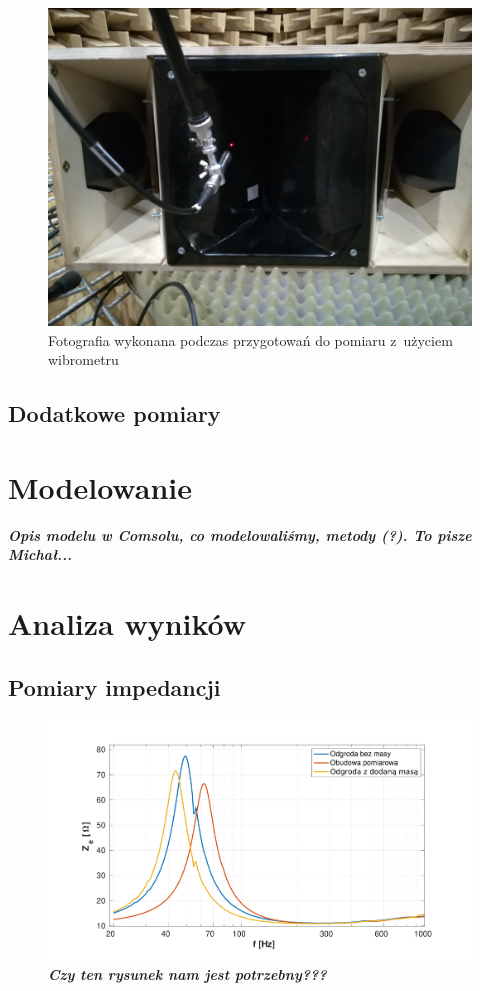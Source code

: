 \documentclass[12pt]{oska}
\newcommand{\comment}[1]{{\color{magenta}\emph{\textbf{#1}}}}
\begin{document}
			\begin{figure}[!ht]
				\centering
				\includegraphics[width=.8\textwidth]{zdjecie_wibro.jpg}
				\caption{Fotografia wykonana podczas przygotowań do pomiaru z~użyciem wibrometru}
				\label{r:zdjecie_wibro}
			\end{figure}

	
	\subsection{Dodatkowe pomiary}\label{ss:dodatkowe}

\section{Modelowanie}

	\comment{Opis modelu w Comsolu, co modelowaliśmy, metody (?). To pisze Michał...}

\section{Analiza wyników}

	\subsection{Pomiary impedancji}
		
		\begin{figure}[!ht]
			\centering
			\includegraphics[width=\textwidth,trim={2cm .5cm 2cm 1cm},clip]{metody_2glosnik.pdf}
			\caption{\comment{Czy ten rysunek nam jest potrzebny???}}
			\label{r:metody}
		\end{figure}
		
\end{document}
